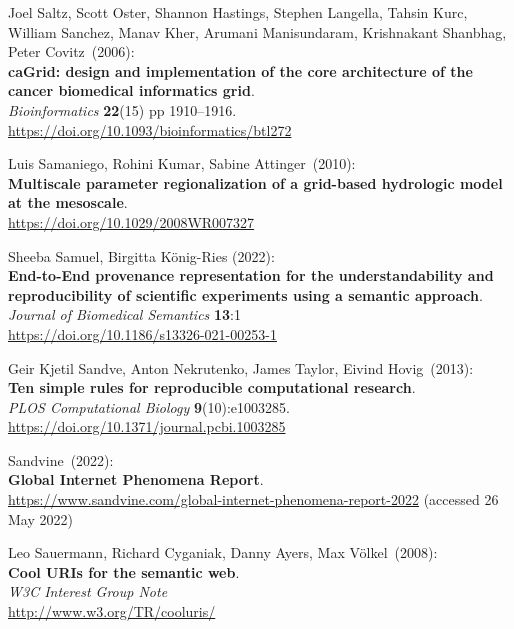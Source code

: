 \begin{thebibliography}{9}
Joel Saltz, Scott Oster, Shannon Hastings, Stephen Langella,
Tahsin Kurc, William Sanchez, Manav Kher, Arumani Manisundaram,
Krishnakant Shanbhag, Peter Covitz~(2006): \\
\textbf{caGrid: design and implementation of the core architecture of
the cancer biomedical informatics grid}.\\
\emph{Bioinformatics}
\textbf{22}(15) pp 1910--1916.\\
\url{https://doi.org/10.1093/bioinformatics/btl272}

Luis Samaniego, Rohini Kumar, Sabine Attinger~(2010): \\
\textbf{Multiscale parameter regionalization of a grid-based hydrologic model at the mesoscale}.\\
\url{https://doi.org/10.1029/2008WR007327}

 Sheeba Samuel, Birgitta König-Ries (2022): \\
\textbf{End-to-End provenance representation for the understandability and reproducibility of scientific experiments using a semantic approach}. \\
\emph{Journal of Biomedical Semantics} \textbf{13}:1 \\
\url{https://doi.org/10.1186/s13326-021-00253-1}

Geir Kjetil Sandve, Anton Nekrutenko, James Taylor, Eivind Hovig~(2013): \\
\textbf{Ten simple rules for reproducible computational research}.\\
\emph{PLOS Computational Biology} \textbf{9}(10):e1003285.\\
\url{https://doi.org/10.1371/journal.pcbi.1003285}

Sandvine~(2022): \\
\textbf{Global Internet Phenomena Report}.\\
\url{https://www.sandvine.com/global-internet-phenomena-report-2022}
(accessed 26 May 2022)

Leo Sauermann, Richard Cyganiak, Danny Ayers, Max Völkel~(2008): \\
\textbf{Cool URIs for the semantic web}.\\
\emph{W3C Interest Group Note}\\
\url{http://www.w3.org/TR/cooluris/}


\end{thebibliography}
